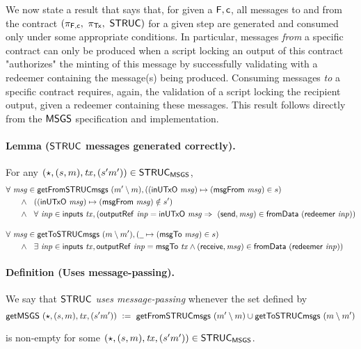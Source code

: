 We now state a result that says that, for given a $\mathsf{F,c}$, all messages to and from
the contract $(\pi_{\mathsf{F, c}},~\pi_{\mathsf{Tx}},~\mathsf{STRUC})$ for a given step are generated
and consumed only under some appropriate conditions. In particular, messages
\emph{from} a specific contract can only be produced when a script locking
an output of this contract "authorizes" the minting of this message by
successfully validating with a redeemer containing the message(s) being produced.
Consuming messages \emph{to} a specific contract requires, again, the
validation of a script locking the recipient output, given a redeemer
containing these messages.
This result follows directly from the $\mathsf{MSGS}$ specification and implementation.

\paragraph{Lemma ($\mathsf{STRUC}$ messages generated correctly). }
\label{lem:msgs-ok}
For any $(\star, (s, m), \mathit{tx}, (s' m')) \in \mathsf{STRUC}_{\mathsf{MSGS}}$,
\begin{align*}
  &\forall ~\var{msg} \in \fun{getFromSTRUCmsgs}~(m' \setminus m),
  ((\fun{inUTxO}~\var{msg}) \mapsto (\fun{msgFrom}~\var{msg}) \in s) \\
  &~~~~~ \wedge ~~  ((\fun{inUTxO}~\var{msg}) \mapsto (\fun{msgFrom}~\var{msg}) \notin s') \\
  &~~~~~ \wedge ~~\forall~\var{inp} \in \inputs~\var{tx}, (\outputref~\var{inp} = \fun{inUTxO}~\var{msg} \Rightarrow ~ (\send, \var{msg}) \in \fun{fromData}~(\redeemer~\var{inp}))
  \nextdef
  &\forall ~\var{msg} \in \fun{getToSTRUCmsgs}~(m \setminus m'),
  (\wcard \mapsto (\fun{msgTo}~\var{msg}) \in s) \\
  &~~~~~ \wedge ~~\exists~\var{inp} \in \inputs~\var{tx}, \outputref~\var{inp} = \fun{msgTo}~\var{tx} \wedge (\receive, \var{msg}) \in \fun{fromData}~(\redeemer~\var{inp}))
\end{align*}

\paragraph{Definition (Uses message-passing). }
\label{def:usesmp}
We say that $\mathsf{STRUC}$ \emph{uses message-passing} whenever the set defined by
\[ \mathsf{getMSGS}~(\star, (s, m), \mathit{tx}, (s' m'))~\mathrel{\mathop:}=~\mathsf{getFromSTRUCmsgs}~(m' \setminus m)
\cup \mathsf{getToSTRUCmsgs}~(m \setminus m')  \]

is non-empty for some $(\star, (s, m), \mathit{tx}, (s' m')) \in \mathsf{STRUC}_{\mathsf{MSGS}}$. \newline


